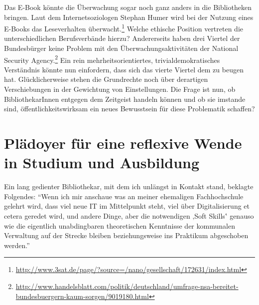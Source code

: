 \documentclass[a4paper,
fontsize=11pt,
oneside,
numbers=noperiodatend,
parskip=half-,
bibliography=totoc,
final
]{scrartcl}
\begin{document}
Das E-Book könnte die Überwachung sogar noch ganz anders in die
Bibliotheken bringen. Laut dem Internetsoziologen Stephan Humer wird bei
der Nutzung eines E-Books das Leseverhalten überwacht.\footnote{\url{http://www.3sat.de/page/?source=/nano/gesellschaft/172631/index.html}}
Welche ethische Position vertreten die unterschiedlichen Berufsverbände
hierzu? Andererseits haben drei Viertel der Bundesbürger keine Problem
mit den Überwachungsakti\-vi\-täten der National Security Agency.\footnote{\url{http://www.handelsblatt.com/politik/deutschland/umfrage-nsa-bereitet-bundesbuergern-kaum-sorgen/9019180.html}}
Ein rein mehrheitsorientiertes, trivialdemokratisches Verständnis könnte
nun einfordern, dass sich das vierte Viertel dem zu beugen hat.
Glücklicher\-weise stehen die Grundrechte noch über derartigen
Verschiebungen in der Gewichtung von Einstellungen. Die Frage ist nun,
ob BibliothekarInnen entgegen dem Zeitgeist handeln können und ob sie
imstande sind, öffentlichkeitswirksam ein neues Bewusstsein für diese
Problematik schaffen?

\section{Plädoyer für eine reflexive Wende in Studium und
Ausbildung}\label{pluxe4doyer-fuxfcr-eine-reflexive-wende-in-studium-und-ausbildung}

Ein lang gedienter Bibliothekar, mit dem ich unlängst in Kontakt stand,
beklagte Folgendes: \enquote{Wenn ich mir anschaue was an meiner
ehemaligen Fachhochschule gelehrt wird, dass viel neue IT im Mittelpunkt
steht, viel über Digitalisierung et cetera geredet wird, und andere
Dinge, aber die notwendigen ‚Soft Skills‛ genauso wie die eigentlich
unabdingbaren theoretischen Kenntnisse der kommunalen Verwaltung auf der
Strecke bleiben beziehungsweise ins Praktikum abgeschoben werden.}
\end{document}

